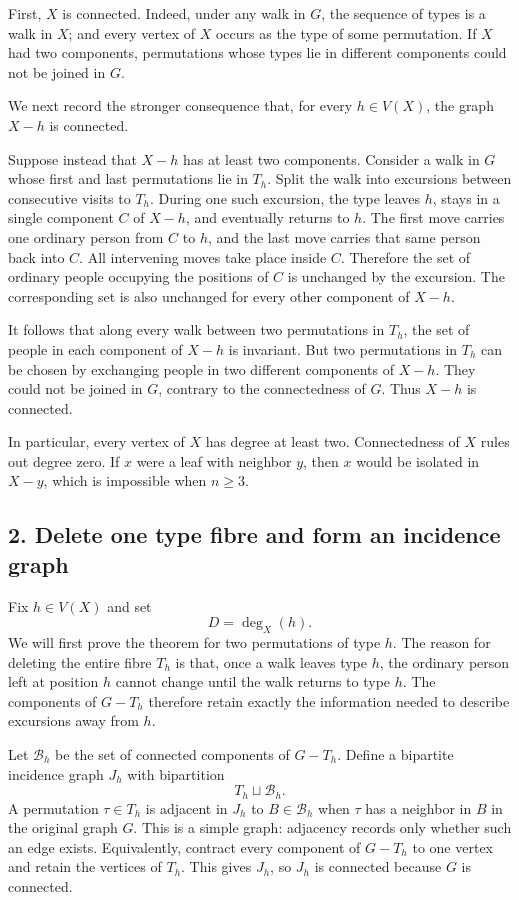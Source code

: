 \documentclass[11pt]{article}
\begin{document}
First, \(X\) is connected. Indeed, under any walk in \(G\), the sequence of types is a walk in \(X\); and every vertex of \(X\) occurs as the type of some permutation. If \(X\) had two components, permutations whose types lie in different components could not be joined in \(G\).

We next record the stronger consequence that, for every \(h\in V(X)\), the graph \(X-h\) is connected.

Suppose instead that \(X-h\) has at least two components. Consider a walk in \(G\) whose first and last permutations lie in \(T_h\). Split the walk into excursions between consecutive visits to \(T_h\). During one such excursion, the type leaves \(h\), stays in a single component \(C\) of \(X-h\), and eventually returns to \(h\). The first move carries one ordinary person from \(C\) to \(h\), and the last move carries that same person back into \(C\). All intervening moves take place inside \(C\). Therefore the set of ordinary people occupying the positions of \(C\) is unchanged by the excursion. The corresponding set is also unchanged for every other component of \(X-h\).

It follows that along every walk between two permutations in \(T_h\), the set of people in each component of \(X-h\) is invariant. But two permutations in \(T_h\) can be chosen by exchanging people in two different components of \(X-h\). They could not be joined in \(G\), contrary to the connectedness of \(G\). Thus \(X-h\) is connected.

In particular, every vertex of \(X\) has degree at least two. Connectedness of \(X\) rules out degree zero. If \(x\) were a leaf with neighbor \(y\), then \(x\) would be isolated in \(X-y\), which is impossible when \(n\geq3\).

\subsection*{2. Delete one type fibre and form an incidence graph}

Fix \(h\in V(X)\) and set
\[
D=\deg_X(h).
\]
We will first prove the theorem for two permutations of type \(h\). The reason for deleting the entire fibre \(T_h\) is that, once a walk leaves type \(h\), the ordinary person left at position \(h\) cannot change until the walk returns to type \(h\). The components of \(G-T_h\) therefore retain exactly the information needed to describe excursions away from \(h\).

Let \(\mathcal B_h\) be the set of connected components of \(G-T_h\). Define a bipartite incidence graph \(J_h\) with bipartition
\[
T_h\sqcup\mathcal B_h.
\]
A permutation \(\tau\in T_h\) is adjacent in \(J_h\) to \(B\in\mathcal B_h\) when \(\tau\) has a neighbor in \(B\) in the original graph \(G\). This is a simple graph: adjacency records only whether such an edge exists. Equivalently, contract every component of \(G-T_h\) to one vertex and retain the vertices of \(T_h\). This gives \(J_h\), so \(J_h\) is connected because \(G\) is connected.
\end{document}
